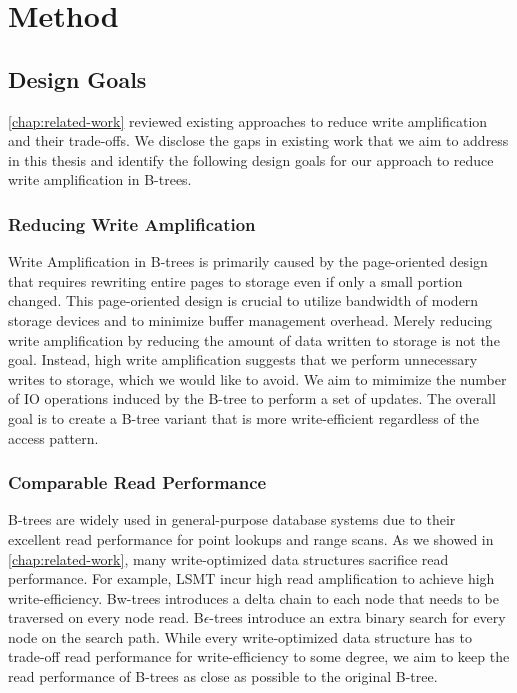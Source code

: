 \chapter{Method}
\label{chap:method}

\section{Design Goals}
\autoref{chap:related-work} reviewed existing approaches to reduce write amplification and their trade-offs.
We disclose the gaps in existing work that we aim to address in this thesis and identify the following design goals for our approach to reduce write amplification in B-trees.

\subsection*{Reducing Write Amplification}
Write Amplification in B-trees is primarily caused by the page-oriented design that requires rewriting entire pages to storage even if only a small portion changed.
This page-oriented design is crucial to utilize bandwidth of modern storage devices and to minimize buffer management overhead.
Merely reducing write amplification by reducing the amount of data written to storage is not the goal.
Instead, high write amplification suggests that we perform unnecessary writes to storage, which we would like to avoid.
We aim to mimimize the number of \ac{IO} operations induced by the B-tree to perform a set of updates.
The overall goal is to create a B-tree variant that is more write-efficient regardless of the access pattern.

\subsection*{Comparable Read Performance}
B-trees are widely used in general-purpose database systems due to their excellent read performance for point lookups and range scans.
As we showed in \autoref{chap:related-work}, many write-optimized data structures sacrifice read performance.
For example, \ac{LSMT} incur high read amplification to achieve high write-efficiency. 
Bw-trees introduces a delta chain to each node that needs to be traversed on every node read.
B$\epsilon$-trees introduce an extra binary search for every node on the search path.
While every write-optimized data structure has to trade-off read performance for write-efficiency to some degree, we aim to keep the read performance of B-trees as close as possible to the original B-tree.

